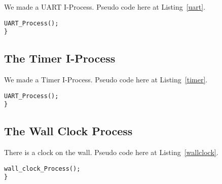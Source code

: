 \documentclass[oneside]{article}
\begin{document}
We made a UART I-Process. Pseudo code here at Listing~\ref{uart}.

\begin{lstlisting}
UART_Process();
}
\end{lstlisting}

\subsection*{The Timer I-Process}

We made a Timer I-Process. Pseudo code here at Listing~\ref{timer}.

\begin{lstlisting}
UART_Process();
}
\end{lstlisting}

\subsection*{The Wall Clock Process}

There is a clock on the wall. Pseudo code here at Listing~\ref{wallclock}.

\begin{lstlisting}
wall_clock_Process();
}
\end{lstlisting}
\end{document}
